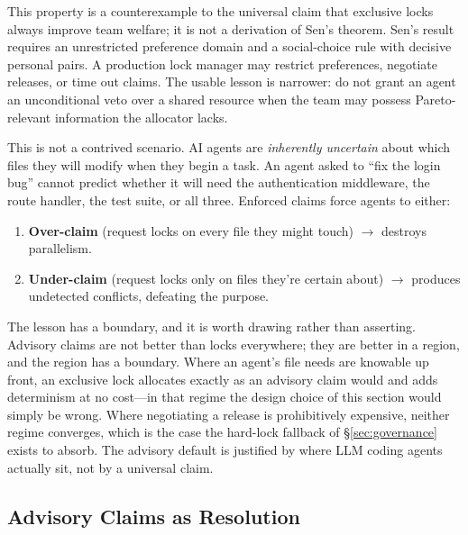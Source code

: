 \documentclass[11pt,a4paper]{article}
\theoremstyle{definition}
\theoremstyle{remark}
\begin{document}


This property is a counterexample to the universal claim that exclusive locks always improve team welfare; it is not a derivation of Sen's theorem. Sen's result requires an unrestricted preference domain and a social-choice rule with decisive personal pairs. A production lock manager may restrict preferences, negotiate releases, or time out claims. The usable lesson is narrower: do not grant an agent an unconditional veto over a shared resource when the team may possess Pareto-relevant information the allocator lacks.

This is not a contrived scenario. AI agents are \emph{inherently uncertain} about which files they will modify when they begin a task. An agent asked to ``fix the login bug'' cannot predict whether it will need the authentication middleware, the route handler, the test suite, or all three. Enforced claims force agents to either:
\begin{enumerate}[nosep]
  \item \textbf{Over-claim} (request locks on every file they might touch) $\rightarrow$ destroys parallelism.
  \item \textbf{Under-claim} (request locks only on files they're certain about) $\rightarrow$ produces undetected conflicts, defeating the purpose.
\end{enumerate}

The lesson has a boundary, and it is worth drawing rather than asserting. Advisory claims are not better than locks everywhere; they are better in a region, and the region has a boundary. Where an agent's file needs are knowable up front, an exclusive lock allocates exactly as an advisory claim would and adds determinism at no cost---in that regime the design choice of this section would simply be wrong. Where negotiating a release is prohibitively expensive, neither regime converges, which is the case the hard-lock fallback of \S\ref{sec:governance} exists to absorb. The advisory default is justified by where LLM coding agents actually sit, not by a universal claim.


\subsection{Advisory Claims as Resolution}\label{sec:advisory}
\end{document}
